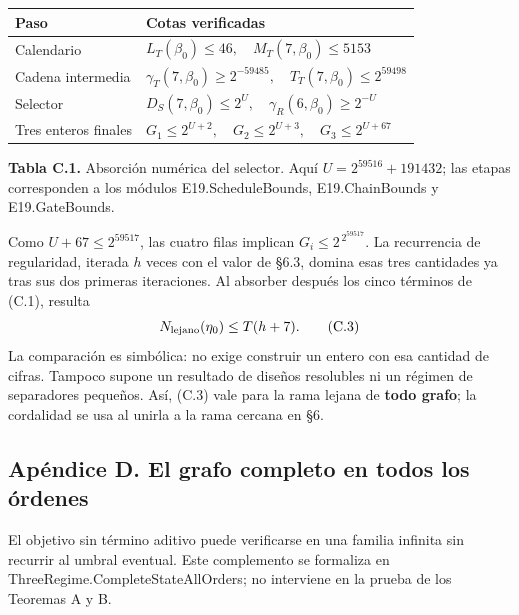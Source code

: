 \documentclass[spanish,11pt,a4paper]{article}
\newcounter{none}
\begin{document}

{\def\LTcaptype{none} %
\begin{longtable}[c]{@{}
  >{\raggedright\arraybackslash}p{}
  >{\raggedright\arraybackslash}p{}@{}}
\toprule\noalign{}
\begin{minipage}[b]{\linewidth}\raggedright
Paso
\end{minipage} & \begin{minipage}[b]{\linewidth}\raggedright
Cotas verificadas
\end{minipage} \\
\midrule\noalign{}
\endhead
\bottomrule\noalign{}
\endlastfoot
Calendario & \(L_T(\beta_0)\le46,\quad M_T(7,\beta_0)\le5153\) \\
Cadena intermedia & \(\gamma_T(7,\beta_0)\ge2^{-59485},\quad T_T(7,\beta_0)\le2^{59498}\) \\
Selector & \(D_S(7,\beta_0)\le2^U,\quad \gamma_R(6,\beta_0)\ge2^{-U}\) \\
Tres enteros finales & \(G_1\le2^{U+2},\quad G_2\le2^{U+3},\quad G_3\le2^{U+67}\) \\
\end{longtable}
}

\textbf{Tabla C.1.} Absorción numérica del selector. Aquí \(U=2^{59516}+191432\); las etapas corresponden a los módulos E19.ScheduleBounds, E19.ChainBounds y E19.GateBounds.

Como \(U+67\le2^{59517}\), las cuatro filas implican \(G_i\le2^{\,2^{59517}}\). La recurrencia de regularidad, iterada \(h\) veces con el valor de §6.3, domina esas tres cantidades ya tras sus dos primeras iteraciones. Al absorber después los cinco términos de (C.1), resulta \[
N_{\rm lejano}(\eta_0)\le T(h+7).
\tag{C.3}
\] La comparación es simbólica: no exige construir un entero con esa cantidad de cifras. Tampoco supone un resultado de diseños resolubles ni un régimen de separadores pequeños. Así, (C.3) vale para la rama lejana de \textbf{todo grafo}; la cordalidad se usa al unirla a la rama cercana en §6.

\subsection{Apéndice D. El grafo completo en todos los órdenes}\label{apendice-d.-el-grafo-completo-en-todos-los-ordenes}

El objetivo sin término aditivo puede verificarse en una familia infinita sin recurrir al umbral eventual. Este complemento se formaliza en {\ttfamily\small ThreeRegime.\discretionary{\hbox{\ensuremath{\hookrightarrow}}}{}{}CompleteStat\discretionary{\hbox{\ensuremath{\hookrightarrow}}}{}{}eAllOrders}; no interviene en la prueba de los Teoremas A y B.
\end{document}
